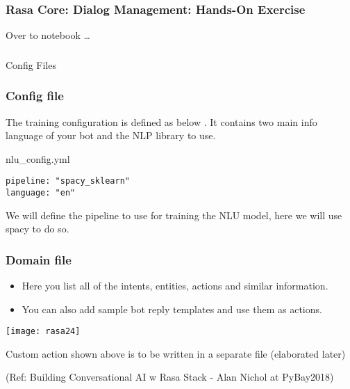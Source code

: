 \begin{frame}[fragile]\frametitle{Rasa Core: Dialog Management: Hands-On Exercise}
\begin{center}

{\Large Over to notebook \ldots}

\end{center}
\end{frame}



\begin{frame}[fragile]\frametitle{}
\begin{center}
{\Large Config Files}

\end{center}
\end{frame}

 \begin{frame}[fragile]\frametitle{Config file}
 
 The training configuration is defined as below . It contains two main info language of your bot and the NLP library to use.
 
 
nlu\_config.yml


\begin{lstlisting}
pipeline: "spacy_sklearn"
language: "en"
\end{lstlisting}

We will define the pipeline to use for training the NLU model, here we will use spacy to do so.
\end{frame}

 \begin{frame}[fragile]\frametitle{Domain file}
 
\begin{itemize}
\item Here you list all of the intents, entities, actions and similar information. 
\item You can also add sample bot reply templates and use them as actions.
\end{itemize}

\begin{center}
\texttt{[image: rasa24]}
\end{center}

Custom action shown above is to be written in a separate file (elaborated later)


{\tiny (Ref: Building Conversational AI w Rasa Stack - Alan Nichol at PyBay2018)}

\end{frame}




